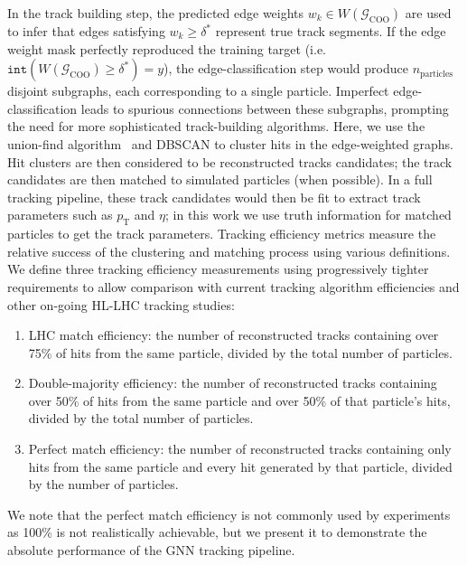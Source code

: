\documentclass[twocolumn]{svjour3}
\newcommand{\pt}{\ensuremath{p_{\mathrm{T}}}\xspace}
\begin{document}
In the track building step, the predicted edge weights $w_k\in W(\mathcal{G}_\mathrm{COO})$ are used to infer that edges satisfying $w_k\geq\delta^*$ represent true track segments. 
If the edge weight mask perfectly reproduced the training target (i.e. $\mathtt{int}(W(\mathcal{G}_\mathrm{COO})\geq\delta^*)=y$), the edge-classification step would produce $n_\mathrm{particles}$ disjoint subgraphs, each corresponding to a single particle. 
Imperfect edge-classification leads to spurious connections between these subgraphs, prompting the need for more sophisticated track-building algorithms. 
Here, we use the union-find algorithm~\cite{unionfind} and DBSCAN to cluster hits in the edge-weighted graphs. 
Hit clusters are then considered to be reconstructed tracks candidates; the track candidates are then matched to simulated particles (when possible). 
In a full tracking pipeline, these track candidates would then be fit to extract track parameters such as $\pt$ and $\eta$; in this work we use truth information for matched particles to get the track parameters.
Tracking efficiency metrics measure the relative success of the clustering and matching process using various definitions. 
We define three tracking efficiency measurements using progressively tighter requirements to allow comparison with current tracking algorithm efficiencies and other on-going HL-LHC tracking studies:
\begin{enumerate}
    \item LHC match efficiency: the number of reconstructed tracks containing over 75\% of hits from the same particle, divided by the total number of particles.
    \item Double-majority efficiency: the number of reconstructed tracks containing over 50\% of hits from the same particle and over 50\% of that particle's hits, divided by the total number of particles.
    \item Perfect match efficiency: the number of reconstructed tracks containing only hits from the same particle and every hit generated by that particle, divided by the number of particles.
\end{enumerate}
We note that the perfect match efficiency is not commonly used by experiments as 100\% is not realistically achievable, but we present it to demonstrate the absolute performance of the GNN tracking pipeline.
\end{document}
